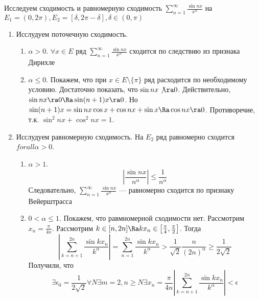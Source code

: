 \begin{example}
    Исследуем сходимость и равномерную сходимость \(\sum_{n = 1}^\infty \frac{\sin nx}{x^\alpha}\) на \(E_1 = (0, 2\pi), E_2 = [\delta, 2\pi - \delta], \delta \in (0, \pi)\)
    \begin{enumerate}
        \item Исслудуем поточечную сходимость.
        \begin{enumerate}
            \item \(\alpha > 0\). \(\forall x \in E\) ряд \(\sum_{n = 1}^\infty \frac{\sin nx}{x^\alpha}\) сходится по следствию из признака Дирихле
            \item \(\alpha \le 0\). Покажем, что при \(x \in E \setminus \{\pi\}\) ряд расходится по необходимому условию. Достаточно показать, что \(\sin nx \not\ra 0\). Действительно, \(\sin nx \ra 0 \Ra \sin (n + 1)x \ra 0\). Но \(\sin (n + 1)x = \sin nx \cos x + \cos nx + \sin x \Ra \cos nx \ra 0\). Противоречие, т.к. \(\sin^2 nx + \cos^2 nx = 1\).
        \end{enumerate}
        \item Исслудуем равномерную сходимость. На \(E_2\) ряд равномерно сходится \(forall \alpha > 0\). 
        \begin{enumerate}
            \item \(\alpha > 1\).
            \[\left|\frac{\sin nx}{n^\alpha}\right| \le \frac{1}{n^\alpha}\]
            Следовательно, \(\sum_{n = 1}^\infty \frac{\sin nx}{x^\alpha}\) --- равномерно сходится по признаку Вейерштрасса
            \item \(0 < \alpha \le 1\). Покажем, что равмномерной сходимости нет. Рассмотрим \(x_n = \frac{\pi}{4n}\). Рассмотрим \(k \in [n, 2n]\Ra kx_n \in \left[\frac{\pi}{4}, \frac{\pi}{2}\right]\). Тогда 
            \[\left|\sum_{k = n + 1}^{2n} \frac{\sin kx_n}{k^\alpha}\right| = \sum_{n = 1}^{2n}\frac{\sin kx_n}{k^\alpha} > \frac{1}{\sqrt{2}}\frac{n}{(2n)^\alpha} \ge \frac{1}{2\sqrt{2}}\]
            Получили, что  
            \[\exists \epsilon_0 = \frac{1}{2\sqrt{2}} \forall N \exists m = 2, n \ge N \exists x_n = \frac{\pi}{4n} \left|\sum_{k = n + 1}^{2n} \frac{\sin kx_n}{k^\alpha}\right| < \epsilon\]
        \end{enumerate}
    \end{enumerate}
\end{example}

